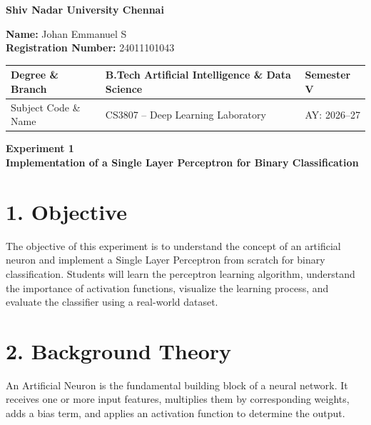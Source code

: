 \documentclass[11pt]{article}
\begin{document}
\begin{center}
\Large\textbf{Shiv Nadar University Chennai}\\[2mm]
\end{center}

\renewcommand{\arraystretch}{1.4}

\begin{flushleft}
\textbf{Name:} Johan Emmanuel S\\
\textbf{Registration Number:} 24011101043\\
\end{flushleft}

\begin{tabular}{|p{3.5cm}|p{8cm}|p{2cm}|}
\hline
Degree \& Branch & B.Tech Artificial Intelligence \& Data Science & Semester V\\ \hline
Subject Code \& Name & CS3807 -- Deep Learning Laboratory & AY: 2026--27\\ \hline
\end{tabular}

\vspace{3mm}

\begin{center}
\Large\textbf{Experiment 1}\\
\large\textbf{Implementation of a Single Layer Perceptron for Binary Classification}
\end{center}


\section*{1. Objective}

The objective of this experiment is to understand the concept of an artificial neuron and implement a Single Layer Perceptron from scratch for binary classification. Students will learn the perceptron learning algorithm, understand the importance of activation functions, visualize the learning process, and evaluate the classifier using a real-world dataset.


\section*{2. Background Theory}

An Artificial Neuron is the fundamental building block of a neural network. It receives one or more input features, multiplies them by corresponding weights, adds a bias term, and applies an activation function to determine the output.
\end{document}

